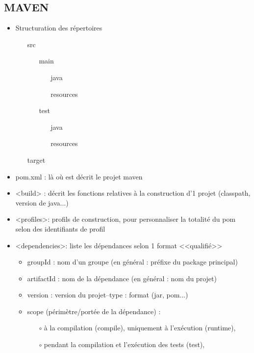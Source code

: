 \documentclass[11pt,twoside,a4paper]{article}
\begin{document}
\begin{landscape}
\begin{multicols}{2}
	\section*{MAVEN}
	\begin{itemize}
		\item Structuration des r{\'e}pertoires
		\begin{itemize}
			\item[] src
			\begin{itemize}
				\item[] main
				\begin{itemize}
					\item[] java
					\item[] resources
				\end{itemize}
				\item[] test
				\begin{itemize}
					\item[] java
					\item[] resources
				\end{itemize}
			\end{itemize}
			\item[] target
		\end{itemize}
		\item[] 
		\item pom.xml : l{\`a} o{\`u} est d{\'e}crit le projet maven
		\item <build> : d{\'e}crit les fonctions relatives {\`a} la construction d'1 projet (classpath, version de java...)
		\item <profiles>: profils de construction, pour personnaliser la totalit{\'e} du pom selon des identifiants de profil
		\item <dependencies>: liste les d{\'e}pendances selon 1 format <<qualifi{\'e}>>
		\begin{itemize}
			\item groupId : nom d'un groupe (en g{\'e}n{\'e}ral : pr{\'e}fixe du package principal)
			\item artifactId : nom de la d{\'e}pendance (en g{\'e}n{\'e}ral : nom du projet)
			\item version : version du projet–type : format (jar, pom...)
			\item scope (p{\'e}rim{\`e}tre/port{\'e}e de la d{\'e}pendance) : 
			\begin{itemize}
				\item[$\circ$] {\`a} la compilation (compile), uniquement {\`a} l'ex{\'e}cution (runtime), 
				\item[$\circ$] pendant la compilation et l'ex{\'e}cution des tests (test), 

\end{itemize}
\end{itemize}
\end{itemize}
\end{multicols}
\end{landscape}
\end{document}
